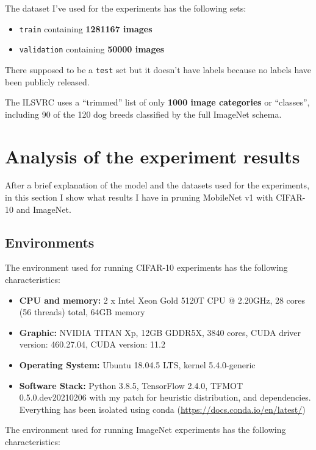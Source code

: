 The dataset I've used for the experiments has the following sets:

\begin{itemize}
    \item \texttt{train} containing \textbf{1281167 images}
    \item \texttt{validation} containing \textbf{50000 images}
\end{itemize}

There supposed to be a \texttt{test} set but it doesn't have labels because no
labels have been publicly released.

The ILSVRC uses a ``trimmed'' list of only \textbf{1000 image categories} or
``classes'', including 90 of the 120 dog breeds classified by the full ImageNet
schema.

\section{Analysis of the experiment results}
After a brief explanation of the model and the datasets used for the
experiments, in this section I show what results I have in pruning MobileNet v1
with CIFAR-10 and ImageNet.

\subsection{Environments}
The environment used for running CIFAR-10 experiments has the following
characteristics:

\begin{itemize}
    \item \textbf{CPU and memory:} 2 x Intel Xeon Gold 5120T CPU @ 2.20GHz, 28
        cores (56 threads) total, 64GB memory
    \item \textbf{Graphic:} NVIDIA TITAN Xp, 12GB GDDR5X, 3840 cores, CUDA
        driver version: 460.27.04, CUDA version: 11.2
    \item \textbf{Operating System:} Ubuntu 18.04.5 LTS, kernel
        5.4.0-generic
    \item \textbf{Software Stack:} Python 3.8.5, TensorFlow 2.4.0, TFMOT
        0.5.0.dev20210206 with my patch for heuristic distribution, and
        dependencies. Everything has been isolated using conda
        (\url{https://docs.conda.io/en/latest/})
\end{itemize}

The environment used for running ImageNet experiments has the following
characteristics:

